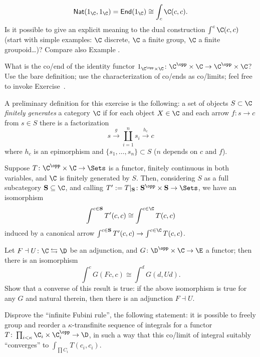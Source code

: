 \begin{exerciseset}
\begin{exercisepoints}
\[
\textsf{Nat}(1_\C, 1_\C) = \textsf{End}(1_\C) \cong \int_c \C(c,c).
\]
Is it possible to give an explicit meaning to the dual construction $\int^c \C(c,c)$ (start with simple examples: $\C$ discrete, $\C$ a finite group, $\C$ a finite groupoid\dots)? Compare also Example .
\item \label{ex1:coendofid} What is the co/end of the identity functor $1_{\C^\opp\times \C}\colon \C^\opp\times \C\to \C^\opp\times \C$? Use the bare definition; use the characterization of co/ends as co/limits; feel free to invoke Exercise~. 
\item A preliminary definition for this exercise is the following: a set of objects $S\subset\C$ \emph{finitely generates} a category $\C$ if for each object $X\in\C$ and each arrow $f : s\to c$ from $s\in S$ there is a factorization
\[
s \xrightarrow{g} \coprod_{i=1}^n s_i\xrightarrow{h_c} c
\]
where $h_c$ is an epimorphism and $\{s_1, \dots, s_n\}\subset S$ ($n$ depends on $c$ and $f$).

Suppose $T\colon \C^\opp\times \C\to \Sets$ is a functor, finitely continuous in both variables, and $\C$ is finitely generated by $S$. Then, considering $S$ as a full subcategory $\mathbf{S}\subseteq \C$, and calling $T' := T|_{\mathbf S}\colon \mathbf{S}^\opp\times\mathbf{S} \to \Sets$, we have an isomorphism
\[
\int^{c\in \mathbf{S}} T'(c,c) \cong \int^{c\in \C} T(c,c)
\] 
induced by a canonical arrow $\int^{c\in \mathbf{S}} T'(c,c) \to \int^{c\in \C} T(c,c)$.
\item \label{ex1:acriterion} Let $F\dashv U\colon \C\leftrightarrows \D$ be an adjunction, and $G \colon \D^\opp\times \C\to \E$ a functor; then there is an isomorphism
\[
\int^c G(Fc,c) \cong \int^d G(d,Ud).
\]
Show that a converse of this result is true: if the above isomorphism is true for any $G$ and natural therein, then there is an adjunction $F\dashv U$.
\item Disprove the ``infinite Fubini rule'', \ie the following statement: it is possible to freely group and reorder a $\kappa$-transfinite sequence of integrals for a functor $T \colon \prod_{i < \kappa} \C_i \times \C_i^\opp \to \D$, in such a way that this co/limit of integral suitably ``converges'' to $\int_{\prod C_i} T(c_i, c_i)$.
\end{exercisepoints}
\end{exerciseset}
